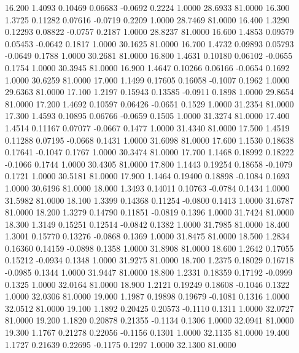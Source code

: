  16.200   1.4093   0.10469   0.06683  -0.0692   0.2224   1.0000  28.6933  81.0000
  16.300   1.3725   0.11282   0.07616  -0.0719   0.2209   1.0000  28.7469  81.0000
  16.400   1.3290   0.12293   0.08822  -0.0757   0.2187   1.0000  28.8237  81.0000
  16.600   1.4853   0.09579   0.05453  -0.0642   0.1817   1.0000  30.1625  81.0000
  16.700   1.4732   0.09893   0.05793  -0.0649   0.1788   1.0000  30.2681  81.0000
  16.800   1.4631   0.10180   0.06102  -0.0655   0.1754   1.0000  30.3945  81.0000
  16.900   1.4647   0.10266   0.06166  -0.0654   0.1692   1.0000  30.6259  81.0000
  17.000   1.1499   0.17605   0.16058  -0.1007   0.1962   1.0000  29.6363  81.0000
  17.100   1.2197   0.15943   0.13585  -0.0911   0.1898   1.0000  29.8654  81.0000
  17.200   1.4692   0.10597   0.06426  -0.0651   0.1529   1.0000  31.2354  81.0000
  17.300   1.4593   0.10895   0.06766  -0.0659   0.1505   1.0000  31.3274  81.0000
  17.400   1.4514   0.11167   0.07077  -0.0667   0.1477   1.0000  31.4340  81.0000
  17.500   1.4519   0.11288   0.07195  -0.0668   0.1431   1.0000  31.6098  81.0000
  17.600   1.1530   0.18638   0.17641  -0.1047   0.1767   1.0000  30.3474  81.0000
  17.700   1.1468   0.18992   0.18222  -0.1066   0.1744   1.0000  30.4305  81.0000
  17.800   1.1443   0.19254   0.18658  -0.1079   0.1721   1.0000  30.5181  81.0000
  17.900   1.1464   0.19400   0.18898  -0.1084   0.1693   1.0000  30.6196  81.0000
  18.000   1.3493   0.14011   0.10763  -0.0784   0.1434   1.0000  31.5982  81.0000
  18.100   1.3399   0.14368   0.11254  -0.0800   0.1413   1.0000  31.6787  81.0000
  18.200   1.3279   0.14790   0.11851  -0.0819   0.1396   1.0000  31.7424  81.0000
  18.300   1.3149   0.15251   0.12514  -0.0842   0.1382   1.0000  31.7985  81.0000
  18.400   1.3001   0.15770   0.13276  -0.0868   0.1369   1.0000  31.8475  81.0000
  18.500   1.2834   0.16360   0.14159  -0.0898   0.1358   1.0000  31.8908  81.0000
  18.600   1.2642   0.17055   0.15212  -0.0934   0.1348   1.0000  31.9275  81.0000
  18.700   1.2375   0.18029   0.16718  -0.0985   0.1344   1.0000  31.9447  81.0000
  18.800   1.2331   0.18359   0.17192  -0.0999   0.1325   1.0000  32.0164  81.0000
  18.900   1.2121   0.19249   0.18608  -0.1046   0.1322   1.0000  32.0306  81.0000
  19.000   1.1987   0.19898   0.19679  -0.1081   0.1316   1.0000  32.0512  81.0000
  19.100   1.1892   0.20425   0.20573  -0.1110   0.1311   1.0000  32.0727  81.0000
  19.200   1.1820   0.20878   0.21355  -0.1134   0.1306   1.0000  32.0941  81.0000
  19.300   1.1767   0.21278   0.22056  -0.1156   0.1301   1.0000  32.1135  81.0000
  19.400   1.1727   0.21639   0.22695  -0.1175   0.1297   1.0000  32.1300  81.0000
